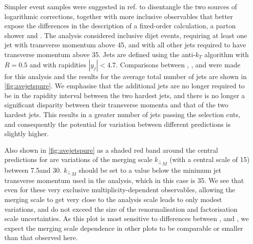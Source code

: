 Simpler event samples were
suggested in ref.\@ \cite{Alioli:2012tp} to disentangle the two sources of
logarithmic corrections, together with more inclusive observables that better expose the
differences in the description of a fixed-order calculation, a parton shower
and \HEJ. The analysis considered inclusive dijet events, requiring at least one jet with 
transverse momentum above 45\GeV, and with all other jets required to have transverse momentum above 35\GeV. 
Jets are defined using the anti-$k_T$ algorithm with $R=0.5$ and with rapidities $|y_j|<4.7$.
Comparisons between \py, \HEJ, and \HEJpy were made for this analysis
and the results for the average total number of jets are shown in \cref{fig:avejetspure}.
We emphasise that the additional jets are no longer required to be in the rapidity interval
between the two hardest jets, and there is no longer a significant disparity between their transverse
momenta and that of the two hardest jets. This results in a greater number of jets 
passing the selection cuts, and consequently the potential for variation between 
different predictions is slightly higher.

Also shown in \cref{fig:avejetspure} as a shaded red band around the central
predictions for \HEJpy are variations of the merging scale ${k_\perp}_{M}$
(with a central scale of 15\GeV) between 7.5\GeV and 30\GeV. ${k_\perp}_{M}$
should be set to a value below the minimum jet transverse momentum used in
the analysis, which in this case is 35\GeV.  We see that even for these very
exclusive multiplicity-dependent observables, allowing the merging scale to
get very close to the analysis scale leads to only modest variations, and do
not exceed the size of the \HEJ renormalisation and factorisation scale
uncertainties.  As this plot is most sensitive to differences between \HEJ,
\py and \HEJpy, we expect the merging scale dependence in other plots to be
comparable or smaller than that observed here.



